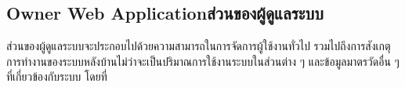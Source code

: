 \subsection{\ifenglish Owner Web Application\else ส่วนของผู้ดูแลระบบ\fi}
ส่วนของผู้ดูแลระบบจะประกอบไปด้วยความสามารถในการจัดการผู้ใช้งานทั่วไป รวมไปถึงการสังเกตุการทำงานของระบบหลังบ้านไม่ว่าจะเป็นปริมาณการใช้งานระบบในส่วนต่าง ๆ และข้อมูลมาตรวัดอื่น ๆ ที่เกี่ยวข้องกับระบบ
โดยที่